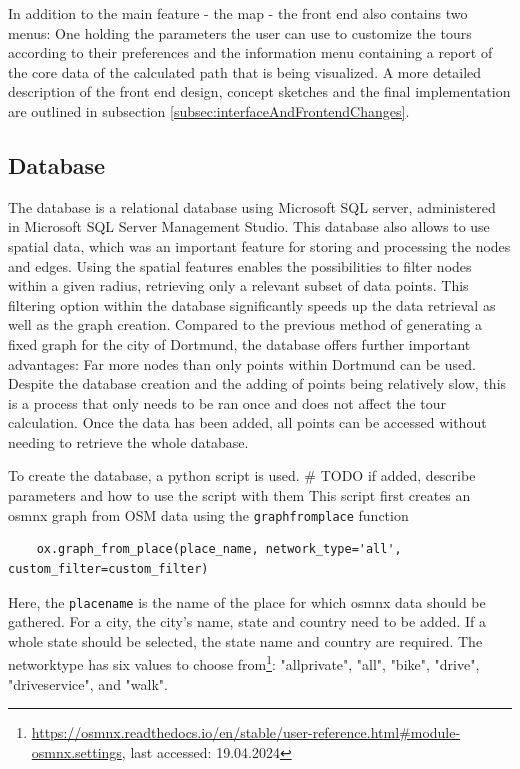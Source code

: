 In addition to the main feature - the map - the front end also contains two menus:
One holding the parameters the user can use to customize the tours according to their preferences and the information menu containing a report of the core data of the calculated path that is being visualized. 
A more detailed description of the front end design, concept sketches and the final implementation are outlined in subsection \ref{subsec:interfaceAndFrontendChanges}.

\subsection{Database}
\label{subsection:database}

The database is a relational database using Microsoft SQL server, administered in Microsoft SQL Server Management Studio.
This database also allows to use spatial data, which was an important feature for storing and processing the nodes and edges.
Using the spatial features enables the possibilities to filter nodes within a given radius, retrieving only a relevant subset of data points.
This filtering option within the database significantly speeds up the data retrieval as well as the graph creation.
Compared to the previous method of generating a fixed graph for the city of Dortmund, the database offers further important advantages:
Far more nodes than only points within Dortmund can be used.
Despite the database creation and the adding of points being relatively slow, this is a process that only needs to be ran once and does not affect the tour calculation. 
Once the data has been added, all points can be accessed without needing to retrieve the whole database.

To create the database, a python script is used. \# TODO if added, describe parameters and how to use the script with them
This script first creates an osmnx graph from OSM data using the \texttt{graph\textunderscore from\textunderscore place} function
\begin{lstlisting}
	ox.graph_from_place(place_name, network_type='all', custom_filter=custom_filter)
\end{lstlisting}

Here, the \texttt{place\textunderscore name} is the name of the place for which osmnx data should be gathered.
For a city, the city's name, state and country need to be added. 
If a whole state should be selected, the state name and country are required.
The network\textunderscore type has six values to choose from\footnote{\url{https://osmnx.readthedocs.io/en/stable/user-reference.html\#module-osmnx.settings}, last accessed: 19.04.2024}: "all\textunderscore private", "all", "bike", "drive", "drive\textunderscore service", and "walk". 

